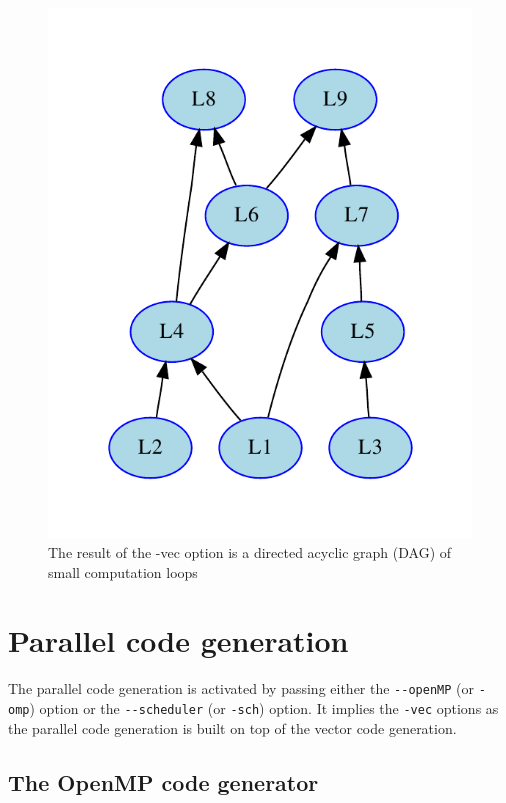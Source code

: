 \begin{figure}[htb]
  \centering
  \includegraphics[scale=0.75]{graphs/loopgraph2}
  \caption{The result of the -vec option is a directed acyclic graph (DAG) of small computation loops}   
  \label{fig:loopgraph}
\end{figure}

\section{Parallel code generation}

The parallel code generation is activated by passing either the \lstinline!--openMP! (or \lstinline!-omp!) option or the \lstinline!--scheduler! (or \lstinline!-sch!) option. It implies the \lstinline!-vec! options as the parallel code generation is built on top of the vector code generation.  

\subsection{The OpenMP code generator}

